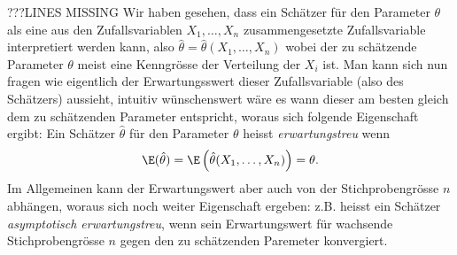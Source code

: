 ???LINES MISSING
Wir haben gesehen, dass ein Schätzer für den Parameter $\theta$ als eine aus den Zufallsvariablen $X_1,\ldots,X_n$ zusammengesetzte Zufallsvariable interpretiert werden kann, also $\hat{\theta}=\hat{\theta}(X_1,\ldots,X_n)$ wobei der zu schätzende Parameter $\theta$ meist eine Kenngrösse der Verteilung der $X_i$ ist. Man kann sich nun fragen wie eigentlich der Erwartungsswert dieser Zufallsvariable (also des Schätzers) aussieht, intuitiv wünschenswert wäre es wann dieser am besten gleich dem zu schätzenden Parameter entspricht, woraus sich folgende Eigenschaft ergibt: Ein Schätzer $\hat{\theta}$ für den Parameter $\theta$ heisst \emph{erwartungstreu} wenn
\begin{gather*}
	\E(\hat{\theta})=\E\left( \hat{\theta}(X_1,\ldots,X_n) \right)=\theta.
\end{gather*}
Im Allgemeinen kann der Erwartungswert aber auch von der Stichprobengrösse $n$ abhängen, woraus sich noch weiter Eigenschaft ergeben: z.B. heisst ein Schätzer \emph{asymptotisch erwartungstreu}, wenn sein Erwartungswert für wachsende Stichprobengrösse $n$ gegen den zu schätzenden Paremeter konvergiert.
